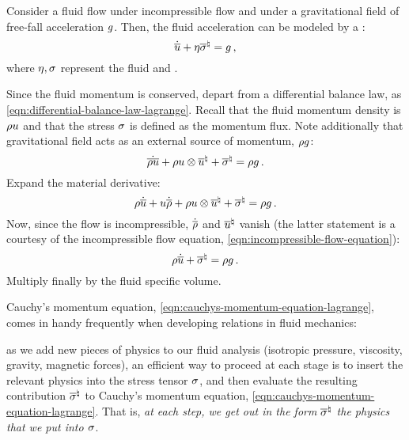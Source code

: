 \begin{model}
  Consider a fluid flow under incompressible flow and under a gravitational field of free-fall acceleration $g$. Then, the fluid acceleration can be modeled by a :
  \begin{equation}\label{eqn:cauchys-momentum-equation-lagrange}
    \dot{\overline{u}} + \eta{\overline{\sigma}}^{\natural} = g\,,
  \end{equation}
  where $\eta,\sigma$ represent the fluid  and .
\end{model}
%
\begin{argument}
  Since the fluid momentum is conserved, depart from a differential balance law, as \cref{eqn:differential-balance-law-lagrange}. Recall that the fluid momentum density is $\rho u$ and that the stress $\sigma$ is defined as the momentum flux. Note additionally that gravitational field acts as an external source of momentum, $\rho g$:
  \begin{equation*}
    \dot{\overline{\rho u}} + \rho u\otimes{\overline{u}}^{\natural} + {\overline{\sigma}}^{\natural} = \rho g\,.
  \end{equation*}
  Expand the material derivative:
  \begin{equation*}
    \rho\dot{\overline{u}} + u\dot{\overline{\rho}} + \rho u\otimes{\overline{u}}^{\natural} + {\overline{\sigma}}^{\natural} = \rho g\,.
  \end{equation*}
  Now, since the flow is incompressible, $\dot{\overline{\rho}}$ and ${\overline{u}}^{\natural}$ vanish (the latter statement is a courtesy of the incompressible flow equation, \cref{eqn:incompressible-flow-equation}):
  \begin{equation*}
    \rho\dot{\overline{u}} + {\overline{\sigma}}^{\natural} = \rho g\,.
  \end{equation*}
  Multiply finally by the fluid specific volume.
\end{argument}

Cauchy's momentum equation, \cref{eqn:cauchys-momentum-equation-lagrange}, comes in handy frequently when developing relations in fluid mechanics:~\cite[chap. 13, p. 19]{thorne2013}
%
\begin{law}
  as we add new pieces of physics to our fluid analysis (isotropic pressure, viscosity, gravity, magnetic forces), an efficient way to proceed at each stage is to insert the relevant physics into the stress tensor $\sigma$, and then evaluate the resulting contribution ${\overline{\sigma}}^{\natural}$ to Cauchy's momentum equation, \cref{eqn:cauchys-momentum-equation-lagrange}. That is, \emph{at each step, we get out in the form ${\overline{\sigma}}^{\natural}$ the physics that we put into $\sigma$}.
\end{law}
